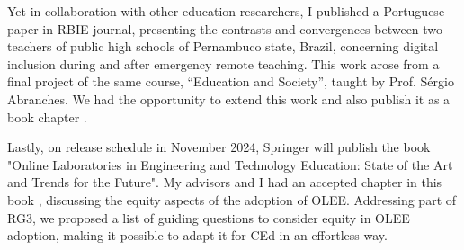 Yet in collaboration with other education researchers, I published a Portuguese paper \cite{bispojr:2023-rbie} in \gls{RBIE} journal, presenting the contrasts and convergences between two teachers of public high schools of Pernambuco state, Brazil, concerning digital inclusion during and after emergency remote teaching. This work arose from a final project of the same course, “Education and Society”, taught by Prof. Sérgio Abranches. We had the opportunity to extend this work and also publish it as a book chapter \cite{sansil:2023}.

 Lastly, on release schedule in November 2024, Springer will publish the book "Online Laboratories in Engineering and Technology Education: State of the Art and Trends for the Future". My advisors and I had an accepted chapter in this book \cite{bispojr:2024-online-lab}, discussing the equity aspects of the adoption of \acrfull{OLEE}. Addressing part of \gls{RG}3, we proposed a list of guiding questions to consider equity in \gls{OLEE} adoption, making it possible to adapt it for \gls{CEd} in an effortless way.

